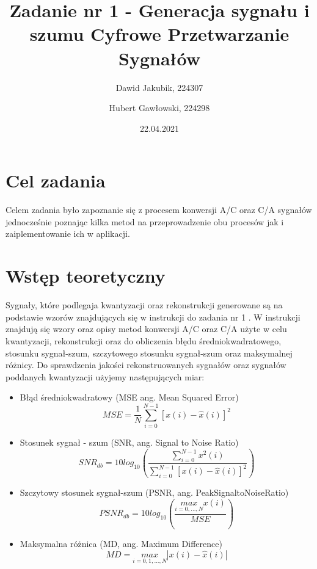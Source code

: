 \documentclass[12pt]{article}
\title{{\bf Zadanie nr 1 - Generacja sygnału i szumu}\linebreak
Cyfrowe Przetwarzanie Sygnałów}
\author{Dawid Jakubik, 224307 \and Hubert Gawłowski, 224298}
\date{22.04.2021}
\begin{document}
\clearpage\maketitle
\thispagestyle{empty}
\newpage
\setcounter{page}{1}
\section{Cel zadania}

Celem zadania było zapoznanie się z procesem konwersji A/C oraz C/A sygnałów jednocześnie poznając kilka metod na przeprowadzenie obu procesów jak i zaiplementowanie ich w aplikacji. 

\section{Wstęp teoretyczny}

Sygnały, które podlegaja kwantyzacji oraz rekonstrukcji generowane są na podstawie wzorów znajdujących się w instrukcji do zadania nr 1 \cite{instrukcja1}. W instrukcji \cite{instrukcja2} znajdują się wzory oraz opisy metod konwersji A/C oraz C/A użyte w celu kwantyzacji, rekonstrukcji oraz do obliczenia błędu średniokwadratowego, stosunku sygnał-szum, szczytowego stosunku sygnał-szum oraz maksymalnej różnicy. Do sprawdzenia jakości rekonstruowanych sygnałów oraz sygnałów poddanych kwantyzacji użyjemy następujących miar:
\begin{itemize}
    \item Błąd średniokwadratowy (MSE ang. Mean Squared Error)
    \begin{equation}
        MSE = \frac{1}{N}\sum_{i=0}^{N-1}[x(i) - \hat{x}(i)]^2
    \end{equation}
    \item Stosunek sygnał - szum (SNR, ang. Signal to Noise Ratio)
    \begin{equation}
        SNR_{db}= 10log_{10}( \frac{\sum_{i=0}^{N-1} x^2(i)}{ \sum_{i=0}^{N-1}[x(i) - \hat{x}(i)]^2})
    \end{equation}
    \item Szczytowy stosunek sygnał-szum (PSNR, ang. PeakSignaltoNoiseRatio)
    \begin{equation}
        PSNR_{db}= 10log_{10}( \frac{\underset{i=0,...,N}{max}x(i)}{MSE})
    \end{equation}
    \item Maksymalna różnica (MD, ang. Maximum Difference)
    \begin{equation}
        MD = \underset{i=0,1,...,N}{max}|x(i) - \hat{x}(i)|
    \end{equation}
\end{itemize}
\end{document}
